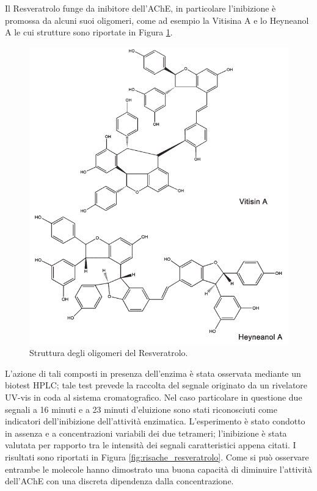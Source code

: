 \documentclass[a4paper, 12pt]{article}
\begin{document}
Il Resveratrolo funge da inibitore dell'AChE, in particolare l'inibizione è promossa da alcuni suoi oligomeri, come ad esempio la Vitisina A e lo Heyneanol A le cui strutture sono riportate in Figura \ref{fig:oly_resveratrolo}.

\begin{figure}[H]
	\centering
	\includegraphics[width=\linewidth]{immagini/oly_resveratrolo.png}
	\caption{Struttura degli oligomeri del Resveratrolo.}
	\label{fig:oly_resveratrolo}
\end{figure}

L'azione di tali composti in presenza dell'enzima è stata osservata mediante un biotest HPLC; tale test prevede la raccolta del segnale originato da un rivelatore UV-vis in coda al sistema cromatografico. Nel caso particolare in questione due segnali a 16 minuti e a 23 minuti d'eluizione sono stati riconosciuti come indicatori dell'inibizione dell'attività enzimatica. L'esperimento è stato condotto in assenza e a concentrazioni variabili dei due tetrameri; l'inibizione è stata valutata per rapporto tra le intensità dei segnali caratteristici appena citati.  I risultati sono riportati in Figura \ref{fig:risache_resveratrolo}. Come si può osservare entrambe le molecole hanno dimostrato una buona capacità di diminuire l'attività dell'AChE con una discreta dipendenza dalla concentrazione.
\end{document}
